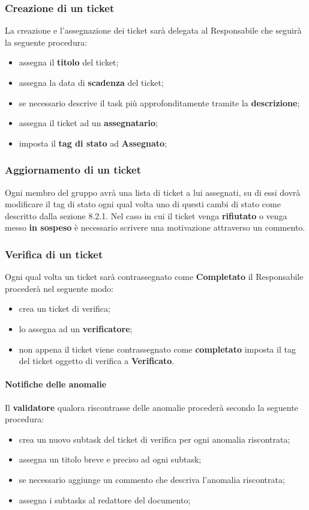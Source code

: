 		\subsubsection{Creazione di un ticket}
		La creazione e l'assegnazione dei ticket sarà delegata al Responsabile che seguirà la seguente procedura:
		\begin{itemize}
			\item assegna il \textbf{titolo} del ticket;
			\item assegna la data di \textbf{scadenza} del ticket;
			\item se necessario descrive il task più approfonditamente tramite la \textbf{descrizione};
			\item assegna il ticket ad un \textbf{assegnatario};
			\item imposta il \textbf{tag di stato} ad \textbf{Assegnato};
		\end{itemize}
		\subsubsection{Aggiornamento di un ticket}
		Ogni membro del gruppo avrà una lista di ticket a lui assegnati, su di essi dovrà modificare il tag di stato ogni qual volta uno di questi cambi di stato come descritto dalla sezione 8.2.1. Nel caso in cui il ticket venga \textbf{rifiutato} o venga messo \textbf{in sospeso} è necessario scrivere una motivazione attraverso un commento.
		\subsubsection{Verifica di un ticket}
		Ogni qual volta un ticket sarà contrassegnato come \textbf{Completato} il Responsabile procederà nel seguente modo: 
		\begin{itemize}
			\item crea un ticket di verifica;
			\item lo assegna ad un \textbf{verificatore};
			\item non appena il ticket viene contrassegnato come \textbf{completato} imposta il tag del ticket oggetto di verifica a \textbf{Verificato}.
		\end{itemize}
		\paragraph{Notifiche delle anomalie}
		Il \textbf{validatore} qualora riscontrasse delle anomalie procederà secondo la seguente procedura:
		\begin{itemize}
			\item crea un nuovo subtask del ticket di verifica per ogni anomalia riscontrata;
			\item assegna un titolo breve e preciso ad ogni subtask;
			\item se necessario aggiunge un commento che descriva l'anomalia riscontrata;
			\item assegna i subtasks al redattore del documento;
		\end{itemize}
		